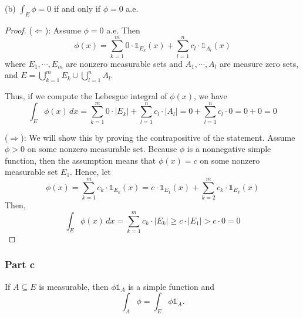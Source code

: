 \begin{question}
    (b) $\int_E \phi=0$ if and only if $\phi=0$ a.e.
\end{question}

\begin{answer}
    \begin{proof}
        ($\Leftarrow$): Assume $\phi = 0$ a.e. Then 
        \begin{equation}
            \phi(x) = \sum_{k=1}^{m}0\cdot \mathbb{1}_{E_k}(x) + \sum_{l=1}^{n} c_l \cdot \mathbb{1}_{A_l}(x)
        \end{equation}
        where $E_1,\cdots, E_m$ are nonzero measurable sets and $A_1,\cdots, A_l$ are measure zero sets, and $E = \bigcup_{k=1}^{m}E_k \cup \bigcup_{l=1}^{n}A_l$.
        
        Thus, if we compute the Lebesgue integral of $\phi(x)$, we have
        \begin{equation}
                \int_E \phi(x) \,dx = \sum_{k=1}^{m}0 \cdot \lvert E_k \rvert + \sum_{l=1}^{n}c_l \cdot \lvert A_l \rvert = 0 + \sum_{l=1}^{n} c_l \cdot 0 = 0 + 0 = 0
        \end{equation}
        
        ($\Rightarrow$): We will show this by proving the contrapositive of the statement. Assume $\phi > 0$ on some nonzero measurable set. Because $\phi$ is a nonnegative simple function, then the assumption means that $\phi(x) = c$ on some nonzero measurable set $E_1$. Hence, let
        \begin{equation}
            \phi(x)= \sum_{k=1}^{m} c_k \cdot \mathbb{1}_{E_k}(x) = c \cdot \mathbb{1}_{E_1}(x) + \sum_{k=2}^{m} c_k \cdot \mathbb{1}_{E_k}(x)
        \end{equation}
        Then, 
        \begin{equation}
            \int_E \phi(x) \,dx = \sum_{k=1}^{m} c_k \cdot \lvert E_k \rvert \geq c \cdot \lvert E_1 \rvert > c \cdot 0 = 0
        \end{equation}
    \end{proof}
\end{answer}

\subsubsection{Part c}

\begin{question}
    If $A \subseteq E$ is measurable, then $\phi \mathbb{1}_A$ is a simple function and
    $$
    \int_A \phi=\int_E \phi \mathbb{1}_A.
    $$
\end{question}

